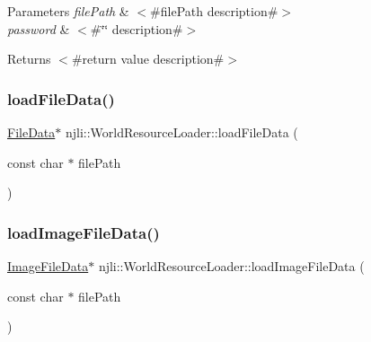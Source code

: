 \begin{DoxyParams}{Parameters}
{\em file\+Path} & $<$\#file\+Path description\#$>$ \\
\hline
{\em password} & $<$\#\char`\"{}\char`\"{} description\#$>$\\
\hline
\end{DoxyParams}
\begin{DoxyReturn}{Returns}
$<$\#return value description\#$>$ 
\end{DoxyReturn}
\mbox{\label{classnjli_1_1_world_resource_loader_a4904946c60cf5f1dc54b98b902d72f0a}} 
\subsubsection{\texorpdfstring{load\+File\+Data()}{loadFileData()}}
{\footnotesize\ttfamily \mbox{\hyperlink{structnjli_1_1_world_resource_loader_1_1_file_data}{File\+Data}}$\ast$ njli\+::\+World\+Resource\+Loader\+::load\+File\+Data (\begin{DoxyParamCaption}\item[{const char $\ast$}]{file\+Path }\end{DoxyParamCaption})\hspace{0.3cm}{\ttfamily [protected]}}

\mbox{\label{classnjli_1_1_world_resource_loader_aba1ff910a058021bf41018e8c27d4bc4}} 
\subsubsection{\texorpdfstring{load\+Image\+File\+Data()}{loadImageFileData()}}
{\footnotesize\ttfamily \mbox{\hyperlink{structnjli_1_1_world_resource_loader_1_1_image_file_data}{Image\+File\+Data}}$\ast$ njli\+::\+World\+Resource\+Loader\+::load\+Image\+File\+Data (\begin{DoxyParamCaption}\item[{const char $\ast$}]{file\+Path }\end{DoxyParamCaption})\hspace{0.3cm}{\ttfamily [protected]}}

